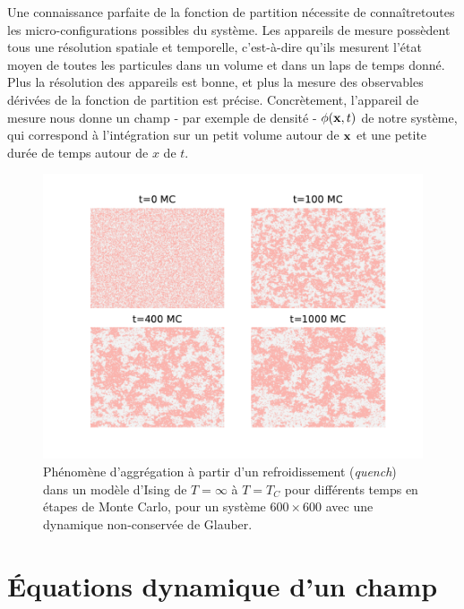 Une connaissance parfaite de la fonction de partition nécessite de connaîtretoutes les micro-configurations possibles du système. Les appareils de mesure possèdent tous une résolution spatiale et temporelle, c'est-à-dire qu'ils mesurent l'état moyen de toutes les particules dans un volume et dans un laps de temps donné. Plus la résolution des appareils est bonne, et plus la mesure des observables dérivées de la fonction de partition est précise. 
Concrètement, l'appareil de mesure nous donne un champ - par exemple de densité - $\phi({\bf x},t)$ de notre système, qui correspond à l'intégration sur un petit volume autour de ${\bf x}$ et une petite durée de temps autour de $x$ de $t$. 

\begin{figure}[h]
    \centering
    \includegraphics[width=0.9\linewidth]{intro/clusterization.pdf}
    \caption{Phénomène d'aggrégation à partir d'un refroidissement (\textit{quench}) dans un modèle d'Ising de $T=\infty$ à $T=T_C$ pour différents temps en étapes de Monte Carlo, pour un système $600 \times 600$ avec une dynamique non-conservée de Glauber.}
    \label{clusterization}
\end{figure}

    \section{Équations dynamique d'un champ}

